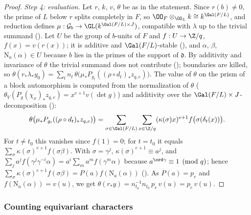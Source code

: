 \begin{proof}
\emph{Step 4: evaluation.} Let $r$, $k$, $v$, $\theta$ be as in the statement. Since $r(b)\ne0$, the prime of $L$ below $r$
splits completely in $F$, so $\OO_F\otimes_{\OO_L}k\cong k^{\Gal(F/L)}$, and reduction defines $\mu:\mathcal G_b\to
\GL(k^{\Gal(F/L)\times J})$, compatible with $\lambda$ up to the trivial summand (). Let $U$
be the group of $b$-units of $F$ and $f:U\to\Z/q$, $f(x)=v(r(x))$; it is additive and $\Gal(F/L)$-stable
(), and $\alpha$, $\beta$, $\mathrm N_a(\alpha)\in U$ because $b$ lies in the primes of the support
of $\mathfrak d$. By additivity and invariance of $\theta$ the trivial summand does not contribute
(); boundaries are killed, so
$\theta(r_*\lambda_*y_0)=\sum_tn_t\,\theta\bigl(\mu_*P_{g_t}((\rho\circ d_t)_*z_{q,e})\bigr)$. The value of $\theta$ on the prism of a
block automorphism is computed from the normalization of $\theta$ ($\theta_V(P_g(\chi_x)_*z_{q,e})=x^{e+1}v(\det g)$) and additivity
over the $\Gal(F/L)\times J$-decomposition ():
\[
 \theta\bigl(\mu_*P_{g_t}((\rho\circ d_t)_*z_{q,e})\bigr)=\sum_{\sigma\in\Gal(F/L)}\sum_{x\in\Z/q}(\kappa(\sigma)x)^{e+1}f\bigl(\sigma(\delta_t(x))\bigr).
\]
For $t\ne t_0$ this vanishes since $f(1)=0$; for $t=t_0$ it equals $\sum_\sigma\kappa(\sigma)^{e+1}f(\sigma\beta)$. With
$\sigma=\gamma^j$, $\kappa(\sigma)^{e+1}\equiv a^j$, and $\sum_ja^jf(\gamma^j\gamma^{-i}\alpha)=a^i\sum_ma^mf(\gamma^m\alpha)$ because
$a^{\ord\gamma}\equiv1\pmod q$; hence $\sum_\sigma\kappa(\sigma)^{e+1}f(\sigma\beta)=P(a)f(\mathrm N_a(\alpha))$
(). As $P(a)=p_e$ and $f(\mathrm N_a(\alpha))=v(u)$, we get
$\theta(r_*y)=n_{t_0}^{-1}n_{t_0}\,p_e\,v(u)=p_e\,v(u)$.
\end{proof}

\subsubsection{Counting equivariant characters}

